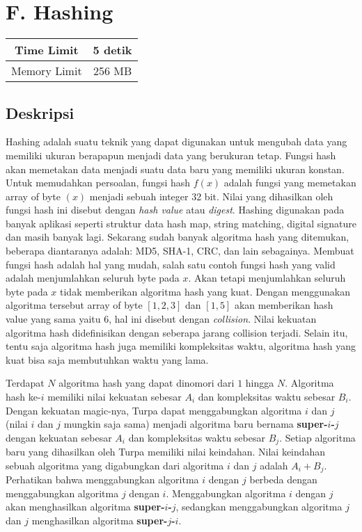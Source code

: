 \documentclass{article}
\begin{document}
\section*{\hfil F. Hashing\hfil}

\begin{center}
\begin{tabular}{ |cc| } 
 \hline
 Time Limit & 5 detik \\ 
 \hline
 Memory Limit & 256 MB \\
 \hline
\end{tabular}
\end{center}

\subsection*{Deskripsi}

\par Hashing adalah suatu teknik yang dapat digunakan untuk mengubah data yang memiliki ukuran berapapun menjadi data yang berukuran tetap. Fungsi hash akan memetakan data menjadi suatu data baru yang memiliki ukuran konstan. Untuk memudahkan persoalan, fungsi hash $f(x)$ adalah fungsi yang memetakan array of byte $(x)$ menjadi sebuah integer 32 bit. Nilai yang dihasilkan oleh fungsi hash ini disebut dengan \textit{hash value} atau \textit{digest}. Hashing digunakan pada banyak aplikasi seperti struktur data hash map, string matching, digital signature dan masih banyak lagi. Sekarang sudah banyak algoritma hash yang ditemukan, beberapa diantaranya adalah: MD5, SHA-1, CRC, dan lain sebagainya. Membuat fungsi hash adalah hal yang mudah, salah satu contoh fungsi hash yang valid adalah menjumlahkan seluruh byte pada $x$. Akan tetapi menjumlahkan seluruh byte pada $x$ tidak memberikan algoritma hash yang kuat. Dengan menggunakan algoritma tersebut array of byte $[1,2,3]$ dan $[1,5]$ akan memberikan hash value yang sama yaitu $6$, hal ini disebut dengan \textit{collision}. Nilai kekuatan algoritma hash didefinisikan dengan seberapa jarang collision terjadi. Selain itu, tentu saja algoritma hash juga memiliki kompleksitas waktu, algoritma hash yang kuat bisa saja membutuhkan waktu yang lama.

\par Terdapat $N$ algoritma hash yang dapat dinomori dari $1$ hingga $N$. Algoritma hash ke-$i$ memiliki nilai kekuatan sebesar $A_i$ dan kompleksitas waktu sebesar $B_i$. Dengan kekuatan magic-nya, Turpa dapat menggabungkan algoritma $i$ dan $j$ (nilai $i$ dan $j$ mungkin saja sama) menjadi algoritma baru bernama \textbf{super-$i$-$j$} dengan kekuatan sebesar $A_i$ dan kompleksitas waktu sebesar $B_j$. Setiap algoritma baru yang dihasilkan oleh Turpa memiliki nilai keindahan. Nilai keindahan sebuah algoritma yang digabungkan dari algoritma $i$ dan $j$ adalah $A_i + B_j$. Perhatikan bahwa menggabungkan algoritma $i$ dengan $j$ berbeda dengan menggabungkan algoritma $j$ dengan $i$. Menggabungkan algoritma $i$ dengan $j$ akan menghasilkan algoritma \textbf{super-$i$-$j$}, sedangkan menggabungkan algoritma $j$ dan $j$ menghasilkan algoritma \textbf{super-$j$-$i$}.
\end{document}
